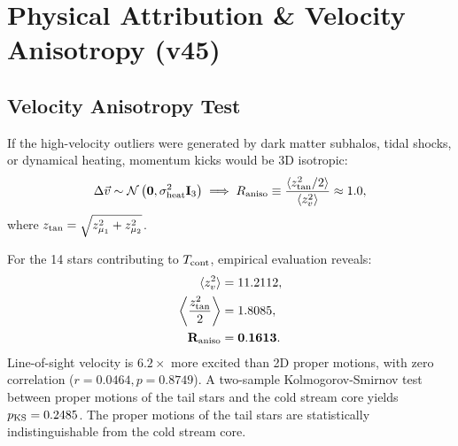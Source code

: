 \documentclass[twocolumn]{aastex631}
\begin{document}
\section{Physical Attribution \& Velocity Anisotropy (v45)}
\label{sec:v45}

\subsection{Velocity Anisotropy Test}
If the high-velocity outliers were generated by dark matter subhalos, tidal shocks, or dynamical heating, momentum kicks would be 3D isotropic:
\begin{equation}
\Delta \vec{v} \sim \mathcal{N}\left(\mathbf{0}, \sigma_{\rm heat}^2 \mathbf{I}_3\right) \implies R_{\rm aniso} \equiv \frac{\langle z_{\rm tan}^2 / 2 \rangle}{\langle z_v^2 \rangle} \approx 1.0,
\end{equation}
where $z_{\rm tan} = \sqrt{z_{\mu_1}^2 + z_{\mu_2}^2}$.

For the 14 stars contributing to $T_{\rm cont}$, empirical evaluation reveals:
\begin{align}
\langle z_v^2 \rangle &= 11.2112, \\
\left\langle \frac{z_{\rm tan}^2}{2} \right\rangle &= 1.8085, \\
\mathbf{R_{\rm aniso}} &= \mathbf{0.1613}.
\end{align}
Line-of-sight velocity is $6.2\times$ more excited than 2D proper motions, with zero correlation ($r = 0.0464, p = 0.8749$). A two-sample Kolmogorov-Smirnov test between proper motions of the tail stars and the cold stream core yields $p_{\rm KS} = 0.2485$. The proper motions of the tail stars are statistically indistinguishable from the cold stream core.
\end{document}
